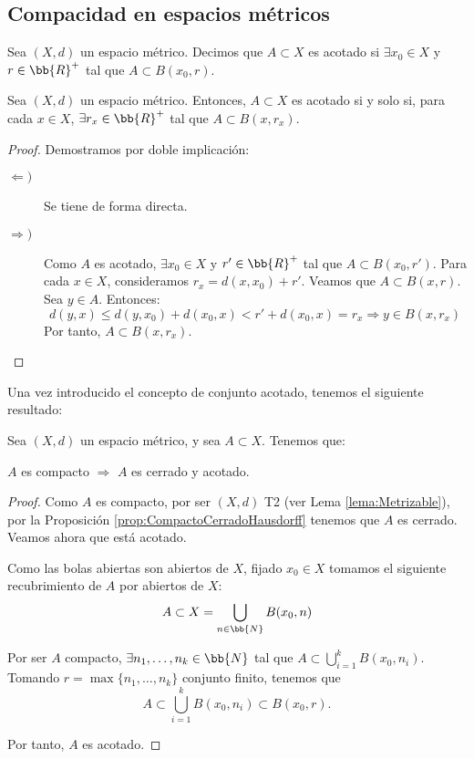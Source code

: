 \subsection{Compacidad en espacios métricos}

\begin{definicion}
    Sea $(X,d)$ un espacio métrico. Decimos que $A\subset X$ es acotado si $\exists x_0\in X$ y $r\in \bb{R}^+$ tal que $A\subset B(x_0,r)$.
\end{definicion}
\begin{lema}
    Sea $(X,d)$ un espacio métrico. Entonces, $A\subset X$ es acotado si y solo si, para cada $x\in X$, $\exists r_x\in \bb{R}^+$ tal que $A\subset B(x,r_x)$.
\end{lema}
\begin{proof}
    Demostramos por doble implicación:
    \begin{description}
        \item[$\Longleftarrow)$] Se tiene de forma directa.
        \item[$\Longrightarrow)$] Como $A$ es acotado, $\exists x_0\in X$ y $r'\in \bb{R}^+$ tal que $A\subset B(x_0,r')$. Para cada $x\in X$, consideramos $r_x=d(x,x_0)+r'$.
        Veamos que $A\subset B(x,r)$. Sea $y\in A$. Entonces:
        \begin{equation*}
            d(y,x) \leq d(y,x_0) + d(x_0,x) < r' + d(x_0,x) = r_x \Longrightarrow y\in B(x,r_x)  
        \end{equation*}
        Por tanto, $A\subset B(x,r_x)$.  \qedhere
    \end{description}
\end{proof}


Una vez introducido el concepto de conjunto acotado, tenemos el siguiente resultado:
\begin{prop}\label{prop:CompactoCerradoAcotado}
    Sea $(X,d)$ un espacio métrico, y sea $A\subset X$. Tenemos que:
    \begin{center}
        $A$ es compacto $\Longrightarrow$ $A$ es cerrado y acotado.
    \end{center}
\end{prop}
\begin{proof}
    Como $A$ es compacto, por ser $(X,d)$ T2 (ver Lema \ref{lema:Metrizable}), por la Proposición \ref{prop:CompactoCerradoHausdorff} tenemos que $A$ es cerrado. Veamos ahora que está acotado.
        
    Como las bolas abiertas son abiertos de $X$, fijado $x_0\in X$ tomamos el siguiente recubrimiento de $A$ por abiertos de $X$:
    \begin{equation*}
        A\subset X = \bigcup_{n \in \bb{N}}B(x_0,n)
    \end{equation*}

    Por ser $A$ compacto, $\exists n_1,\dots,n_k\in \bb{N}$ tal que $A\subset \bigcup\limits_{i=1}^k B(x_0,n_i)$.
    Tomando $r=\max\{n_1,\dots,n_k\}$ conjunto finito, tenemos que $$A\subset \bigcup\limits_{i=1}^k B(x_0,n_i) \subset B(x_0,r).$$
    
    Por tanto, $A$ es acotado.
\end{proof}

